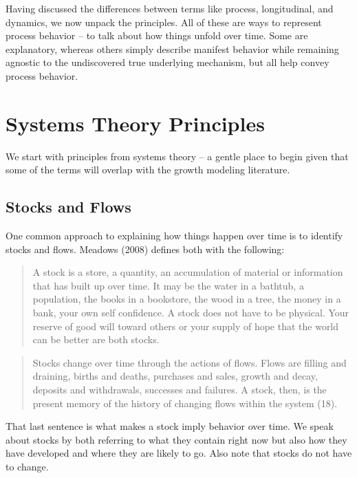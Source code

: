 \documentclass[english,,man]{apa6}
\theoremstyle{definition}
\theoremstyle{definition}
\theoremstyle{definition}
\theoremstyle{remark}
\begin{document}
Having discussed the differences between terms like process,
longitudinal, and dynamics, we now unpack the principles. All of these
are ways to represent process behavior -- to talk about how things
unfold over time. Some are explanatory, whereas others simply describe
manifest behavior while remaining agnostic to the undiscovered true
underlying mechanism, but all help convey process behavior.

\hypertarget{systems-theory-principles}{%
\section{Systems Theory Principles}\label{systems-theory-principles}}

We start with principles from systems theory -- a gentle place to begin
given that some of the terms will overlap with the growth modeling
literature.

\hypertarget{stocks-and-flows}{%
\subsection{Stocks and Flows}\label{stocks-and-flows}}

One common approach to explaining how things happen over time is to
identify stocks and flows. Meadows (2008) defines both with the
following:

\begin{quote}
A stock is a store, a quantity, an accumulation of material or
information that has built up over time. It may be the water in a
bathtub, a population, the books in a bookstore, the wood in a tree, the
money in a bank, your own self confidence. A stock does not have to be
physical. Your reserve of good will toward others or your supply of hope
that the world can be better are both stocks.
\end{quote}

\begin{quote}
Stocks change over time through the actions of flows. Flows are filling
and draining, births and deaths, purchases and sales, growth and decay,
deposits and withdrawals, successes and failures. A stock, then, is the
present memory of the history of changing flows within the system (18).
\end{quote}

\noindent That last sentence is what makes a stock imply behavior over
time. We speak about stocks by both referring to what they contain right
now but also how they have developed and where they are likely to go.
Also note that stocks do not have to change.
\end{document}
